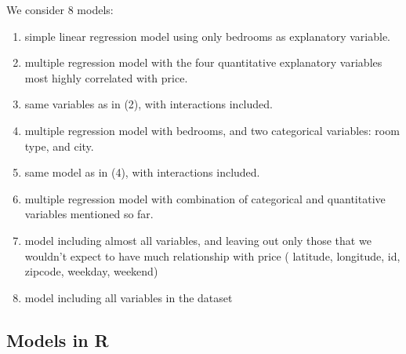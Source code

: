 \documentclass[]{book}
\providecommand{\tightlist}{%
  \setlength{\itemsep}{0pt}\setlength{\parskip}{0pt}}
\begin{document}
We consider 8 models:

\begin{enumerate}
\def\labelenumi{\arabic{enumi}.}
\tightlist
\item
  simple linear regression model using only bedrooms as explanatory
  variable.\\
\item
  multiple regression model with the four quantitative explanatory
  variables most highly correlated with price.\\
\item
  same variables as in (2), with interactions included.\\
\item
  multiple regression model with bedrooms, and two categorical
  variables: room type, and city.\\
\item
  same model as in (4), with interactions included.
\item
  multiple regression model with combination of categorical and
  quantitative variables mentioned so far.\\
\item
  model including almost all variables, and leaving out only those that
  we wouldn't expect to have much relationship with price ( latitude,
  longitude, id, zipcode, weekday, weekend)\\
\item
  model including all variables in the dataset
\end{enumerate}

\subsection{Models in R}\label{models-in-r}
\end{document}
